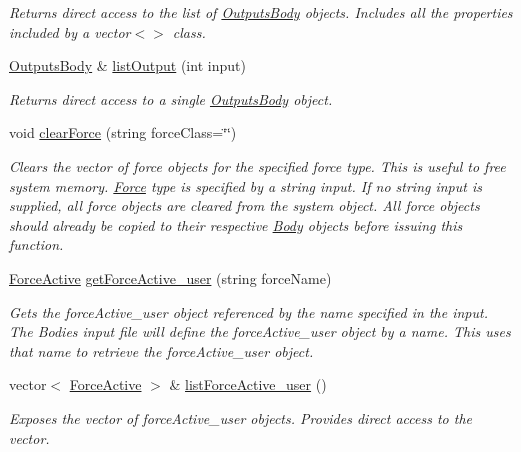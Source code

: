 \begin{DoxyCompactItemize}
\begin{DoxyCompactList}\small\item\em Returns direct access to the list of \hyperlink{class_outputs_body}{Outputs\-Body} objects. Includes all the properties included by a vector$<$$>$ class. \end{DoxyCompactList}\item 
\hyperlink{class_outputs_body}{Outputs\-Body} \& \hyperlink{class_system_a25b21c2fe11293ecf46ee3f9371afe21}{list\-Output} (int input)
\begin{DoxyCompactList}\small\item\em Returns direct access to a single \hyperlink{class_outputs_body}{Outputs\-Body} object. \end{DoxyCompactList}\item 
void \hyperlink{class_system_af2b3029eb59ffa5fab95e9528592c111}{clear\-Force} (string force\-Class=\char`\"{}\char`\"{})
\begin{DoxyCompactList}\small\item\em Clears the vector of force objects for the specified force type. This is useful to free system memory. \hyperlink{class_force}{Force} type is specified by a string input. If no string input is supplied, all force objects are cleared from the system object. All force objects should already be copied to their respective \hyperlink{class_body}{Body} objects before issuing this function. \end{DoxyCompactList}\item 
\hyperlink{class_force_active}{Force\-Active} \hyperlink{class_system_abec70f59e8adc1d3df942c7893b0736a}{get\-Force\-Active\-\_\-user} (string force\-Name)
\begin{DoxyCompactList}\small\item\em Gets the force\-Active\-\_\-user object referenced by the name specified in the input. The Bodies input file will define the force\-Active\-\_\-user object by a name. This uses that name to retrieve the force\-Active\-\_\-user object. \end{DoxyCompactList}\item 
vector$<$ \hyperlink{class_force_active}{Force\-Active} $>$ \& \hyperlink{class_system_ac50ce91b4ad00fd7748c316ba5fe70a6}{list\-Force\-Active\-\_\-user} ()
\begin{DoxyCompactList}\small\item\em Exposes the vector of force\-Active\-\_\-user objects. Provides direct access to the vector. \end{DoxyCompactList}\item 

\end{DoxyCompactItemize}
